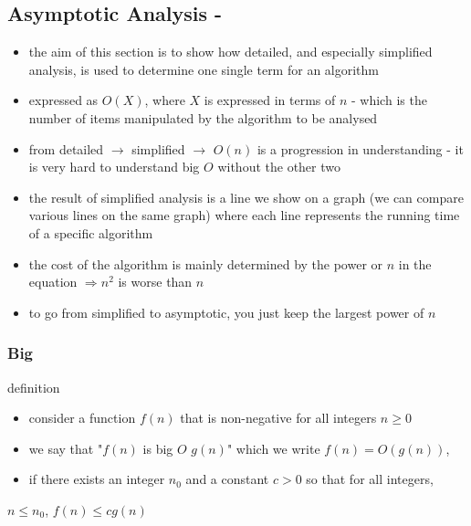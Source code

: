 \newpage

\subsection{Asymptotic Analysis - }

\begin{itemize}
    \item the aim of this section is to show how detailed, and especially simplified analysis, is used to determine one single term for an algorithm
    \item expressed as $O(X)$, where $X$ is expressed in terms of $n$ - which is the number of items manipulated by the algorithm to be analysed
    \item from detailed $\rightarrow$ simplified $\rightarrow$ $O(n)$ is a progression in understanding - it is very hard to understand big $O$ without the other two 
    \item the result of simplified analysis is a line we show on a graph (we can compare various lines on the same graph) where each line represents the running time of a specific algorithm
    \item the cost of the algorithm is mainly determined by the \textcolor{Periwinkle}{power or $n$} in the equation $\Rightarrow n^2$ is worse than $n$
    \item to go from simplified to asymptotic, you just keep the largest power of $n$
\end{itemize}

\subsubsection{Big }

\begin{mybox}[Periwinkle]{definition}
    \begin{itemize}
        \item[] consider a function $f(n)$ that is non-negative for all integers $n \geq 0$
        \item[] we say that "$f(n)$ is big $O$ $g(n)$" which we write $f(n) = O(g(n))$, 
        \item[] if there exists an integer $n_0$ and a constant $c > 0$ so that for all integers,
    \end{itemize}

    \begin{center}
         $n \leq n_0$, $f(n) \leq c g(n)$
    \end{center}
\end{mybox}

